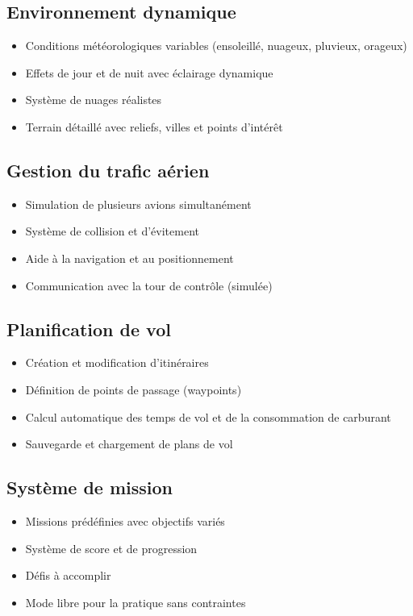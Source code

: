 \documentclass[12pt,a4paper]{article}
\begin{document}
\subsection{Environnement dynamique}
\begin{itemize}
    \item Conditions météorologiques variables (ensoleillé, nuageux, pluvieux, orageux)
    \item Effets de jour et de nuit avec éclairage dynamique
    \item Système de nuages réalistes
    \item Terrain détaillé avec reliefs, villes et points d'intérêt
\end{itemize}

\subsection{Gestion du trafic aérien}
\begin{itemize}
    \item Simulation de plusieurs avions simultanément
    \item Système de collision et d'évitement
    \item Aide à la navigation et au positionnement
    \item Communication avec la tour de contrôle (simulée)
\end{itemize}

\subsection{Planification de vol}
\begin{itemize}
    \item Création et modification d'itinéraires
    \item Définition de points de passage (waypoints)
    \item Calcul automatique des temps de vol et de la consommation de carburant
    \item Sauvegarde et chargement de plans de vol
\end{itemize}

\subsection{Système de mission}
\begin{itemize}
    \item Missions prédéfinies avec objectifs variés
    \item Système de score et de progression
    \item Défis à accomplir
    \item Mode libre pour la pratique sans contraintes
\end{itemize}
\end{document}
